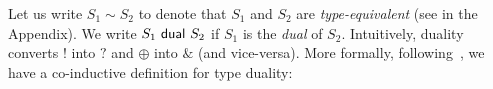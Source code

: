 
Let us write $S_1 \sim S_2$
to denote that $S_1$ and $S_2$ are \emph{type-equivalent} (see 
 in the Appendix).
We write $S_1 \ \mathsf{dual}\  S_2$ if 
$S_1$ is the \emph{dual} of $S_2$.   
Intuitively, 
duality
converts $!$ into $?$ and $\oplus$ into $\&$ (and vice-versa).
More formally, following~\cite{TGC14},
we have a co-inductive definition for 
type {duality}:

%	


